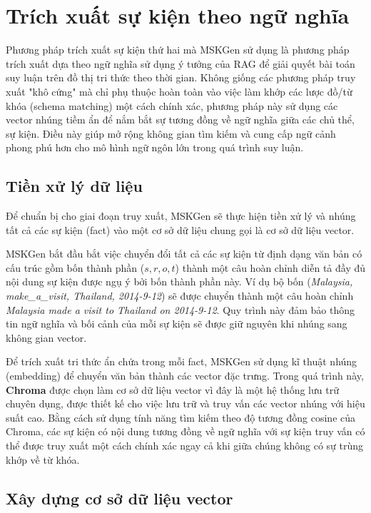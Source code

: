 \vspace{1em}
\section{Trích xuất sự kiện theo ngữ nghĩa}

Phương pháp trích xuất sự kiện thứ hai mà MSKGen sử dụng là phương pháp trích xuất dựa theo ngữ nghĩa sử dụng ý tưởng của RAG để giải quyết bài toán suy luận trên đồ thị tri thức theo thời gian. Không giống các phương pháp truy xuất "khô cứng" mà chỉ phụ thuộc hoàn toàn vào việc làm khớp các lược đồ/từ khóa (schema matching) một cách chính xác, phương pháp này sử dụng các vector nhúng tiềm ẩn để nắm bắt sự tương đồng về ngữ nghĩa giữa các chủ thể, sự kiện. Điều này giúp mở rộng không gian tìm kiếm và cung cấp ngữ cảnh phong phú hơn cho mô hình ngữ ngôn lớn trong quá trình suy luận.

\vspace{1em}
\subsection{Tiền xử lý dữ liệu}
Để chuẩn bị cho giai đoạn truy xuất, MSKGen sẽ thực hiện tiền xử lý và nhúng tất cả các sự kiện (fact) vào một cơ sở dữ liệu chung gọi là cơ sở dữ liệu vector.

MSKGen bắt đầu bắt việc chuyển đổi tất cả các sự kiện từ định dạng văn bản có cấu trúc gồm bốn thành phần ($s, r, o, t$) thành một câu hoàn chỉnh diễn tả đầy đủ nội dung sự kiện được ngụ ý bởi bốn thành phần này. Ví dụ bộ bốn (\textit{Malaysia, make\_a\_visit, Thailand, 2014-9-12}) sẽ được chuyển thành một câu hoàn chỉnh \textit{Malaysia made a visit to Thailand on 2014-9-12}. Quy trình này đảm bảo thông tin ngữ nghĩa và bối cảnh của mỗi sự kiện sẽ được giữ nguyên khi nhúng sang không gian vector.

Để trích xuất tri thức ẩn chứa trong mỗi fact, MSKGen sử dụng kĩ thuật nhúng (embedding) để chuyển văn bản thành các vector đặc trưng. Trong quá trình này, \textbf{Chroma} được chọn làm cơ sở dữ liệu vector vì đây là một hệ thống lưu trữ chuyên dụng, được thiết kế cho việc lưu trữ và truy vấn các vector nhúng với hiệu suất cao. Bằng cách sử dụng tính năng tìm kiếm theo độ tương đồng cosine của Chroma, các sự kiện có nội dung tương đồng về ngữ nghĩa với sự kiện truy vấn có thể được truy xuất một cách chính xác ngay cả khi giữa chúng không có sự trùng khớp về từ khóa.

\vspace{1em}
\subsection{Xây dựng cơ sở dữ liệu vector}

